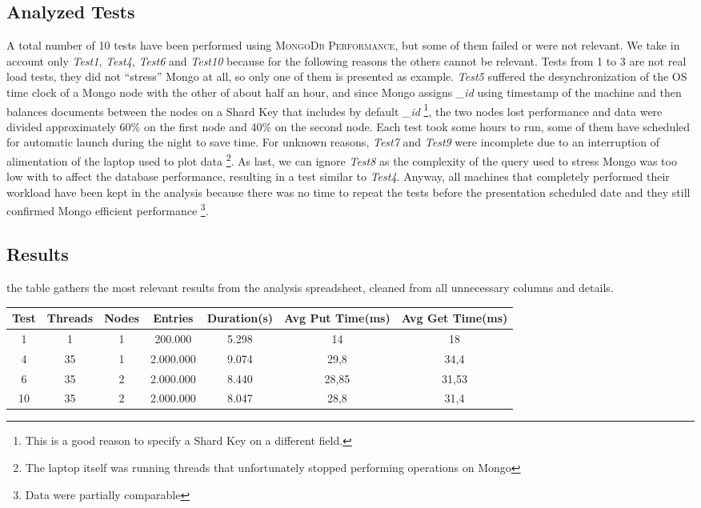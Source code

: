 \subsection{Analyzed Tests}
A total number of 10 tests have been performed using \textsc{MongoDb Performance}, but some of them failed or were not relevant.
We take in account only \textit{Test1}, \textit{Test4}, \textit{Test6} and \textit{Test10} because for the following reasons the others cannot be relevant.
Tests from 1 to 3 are not real load tests, they did not “stress” Mongo at all, so only one of them is presented as example.
\textit{Test5} suffered the desynchronization of the OS time clock of a Mongo node with the other of about half an hour, and since Mongo assigns \textit{\_id} using timestamp of the machine and then balances documents between the nodes on a Shard Key that includes by default \textit{\_id} \footnote{This is a good reason to specify a Shard Key on a different field.}, the two nodes lost performance and data were divided approximately 60\% on the first node and 40\% on the second node. 
Each test  took some hours to run, some of them have scheduled for automatic launch during the night to save time.
For unknown reasons, \textit{Test7} and  \textit{Test9} were incomplete due to an interruption of alimentation of the laptop used to plot data \footnote{The laptop itself was running threads that unfortunately stopped performing operations on Mongo}.
As last, we can ignore \textit{Test8} as the complexity of the query used to stress Mongo was too low with to affect the database performance, resulting in a test similar to \textit{Test4}.
Anyway, all machines that completely performed their workload have been kept in the analysis because there was no time to repeat the tests before the presentation scheduled date and they still confirmed Mongo efficient performance \footnote{Data were partially comparable}.

\subsection{Results}
the table gathers the most relevant results from the analysis spreadsheet, cleaned from all unnecessary columns and details.
\begin{table}[H]
\centering
\label{my-label}
\begin{tabular}{@{}ccccccc@{}}
\toprule
\rowcolor[HTML]{BBDAFF} 
Test & Threads & Nodes & Entries & Duration(s) & Avg Put Time(ms) & Avg Get Time(ms) \\ \midrule
\rowcolor[HTML]{FFCC67} 
1 & 1 & 1 & 200.000 & 5.298 & 14 & 18 \\
\rowcolor[HTML]{FFCC67} 
4 & 35 & 1 & 2.000.000 & 9.074 & 29,8 & 34,4 \\
\rowcolor[HTML]{FFCC67} 
6 & 35 & 2 & 2.000.000 & 8.440 & 28,85 & 31,53 \\
\rowcolor[HTML]{FFCC67} 
10 & 35 & 2 & 2.000.000 & 8.047 & 28,8 & 31,4 \\ \bottomrule
\end{tabular}
\end{table}

